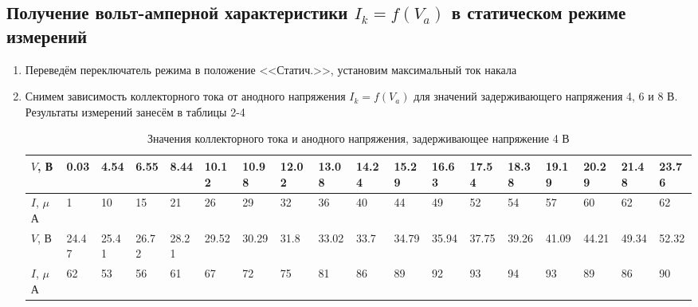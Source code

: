 \documentclass[a4paper]{article}
\begin{document}
\subsection{Получение вольт-амперной характеристики $I_k = f(V_a)$ в статическом режиме измерений}

\begin{enumerate}
    \item Переведём переключатель режима в положение <<Статич.>>, установим максимальный ток накала
    \item Снимем зависимость коллекторного тока от анодного напряжения $I_k = f(V_a)$ для значений задерживающего напряжения 4, 6 и 8 В. Результаты измерений занесём в таблицы 2-4
    
    \begin{table}[h]
    \centering
    \begin{center}
    \caption{Значения коллекторного тока и анодного напряжения, задерживающее напряжение 4 В}
    \end{center}
    \vspace{0.1cm}
    \label{tab:my_label}
    \begin{tabular}{ |p{1cm}||p{0.6cm}|p{0.6cm}|p{0.6cm}|p{0.6cm}|p{0.6cm}|p{0.6cm}|p{0.6cm}|p{0.6cm}|p{0.6cm}|p{0.6cm}|p{0.6cm}|p{0.6cm}|p{0.6cm}|p{0.6cm}|p{0.6cm}|p{0.6cm}|p{0.6cm}|}
 \hline
$V$, В & 0.03 & 4.54 & 6.55 & 8.44 & 10.12 & 10.98 & 12.02 & 13.08 & 14.24 & 15.29 & 16.63 & 17.54 & 18.38 & 19.19 & 20.29 & 21.48 & 23.76\\
 \hline
 $I$, $\mu$А & 1 & 10 & 15 & 21 & 26 & 29 & 32 & 36 & 40 & 44 & 49 & 52 & 54 & 57 & 60 & 62 & 62\\
\hline
\hline
$V$, В & 24.47 & 25.41 & 26.72 & 28.21 & 29.52 & 30.29 & 31.8 & 33.02 & 33.7 & 34.79 & 35.94 & 37.75 & 39.26 & 41.09 & 44.21 & 49.34 & 52.32\\
\hline
$I$, $\mu$А & 62 & 53 & 56 & 61 & 67 & 72 & 75 & 81 & 86 & 89 & 92 & 93 & 94 & 93 & 89 & 86 & 90\\
\hline
 
\end{tabular}
\end{table}


\end{enumerate}
\end{document}
